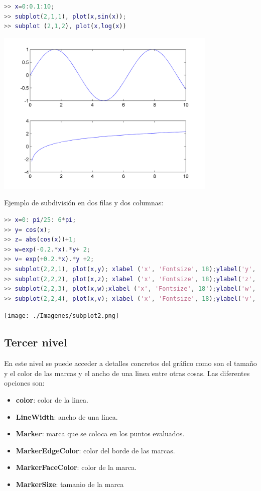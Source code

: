 \begin{lstlisting}[language=Matlab]
>> x=0:0.1:10;
>> subplot(2,1,1), plot(x,sin(x));
>> subplot (2,1,2), plot(x,log(x))
\end{lstlisting}
\begin{center}
\includegraphics[width=300pt]{./Imagenes/subplot.png}
\end{center}

Ejemplo de subdivisión en dos filas y dos columnas:

\begin{lstlisting}[language=Matlab]
>> x=0: pi/25: 6*pi;  
>> y= cos(x); 
>> z= abs(cos(x))+1;  
>> w=exp(-0.2.*x).*y+ 2; 
>> v= exp(+0.2.*x).*y +2;  
>> subplot(2,2,1), plot(x,y); xlabel ('x', 'Fontsize', 18);ylabel('y','Fontsize', 18)  
>> subplot(2,2,2), plot(x,z); xlabel ('x', 'Fontsize', 18);ylabel('z', 'Fontsize', 18) 
>> subplot(2,2,3), plot(x,w);xlabel ('x', 'Fontsize', 18');ylabel('w','Fontsize', 18) 
>> subplot(2,2,4), plot(x,v); xlabel ('x', 'Fontsize', 18);ylabel('v', 'Fontsize', 18)
\end{lstlisting}
\begin{center}
\texttt{[image: ./Imagenes/subplot2.png]}
\end{center}


\subsection{Tercer nivel}

En este nivel se puede acceder a detalles concretos del gráfico como son el tamaño y el color de las marcas y el ancho de una linea entre otras cosas. Las diferentes opciones son:

\begin{itemize}
\item \textbf{color}: color de la linea.
\item \textbf{LineWidth}: ancho de una linea.
\item \textbf{Marker}: marca que se coloca en los puntos evaluados.
\item \textbf{MarkerEdgeColor}: color del borde de las marcas.
\item \textbf{MarkerFaceColor}: color de la marca.
\item \textbf{MarkerSize}: tamanio de la marca
\end{itemize}

